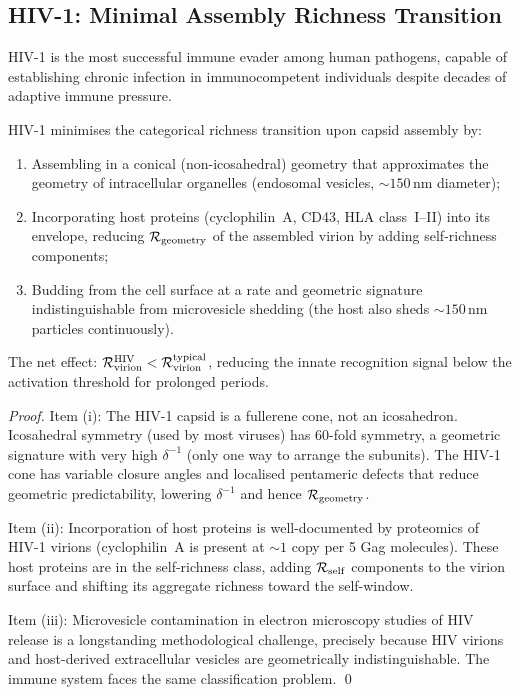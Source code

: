 \subsection{HIV-1: Minimal Assembly Richness Transition}

HIV-1 is the most successful immune evader among human pathogens, capable of
establishing chronic infection in immunocompetent individuals despite decades
of adaptive immune pressure.

\begin{proposition}
\label{prop:hiv_evasion}
HIV-1 minimises the categorical richness transition upon capsid assembly by:
\begin{enumerate}[label=(\roman*)]
  \item Assembling in a conical (non-icosahedral) geometry that approximates
        the geometry of intracellular organelles (endosomal vesicles,
        $\sim 150\,\mathrm{nm}$ diameter);
  \item Incorporating host proteins (cyclophilin~A, CD43, HLA class~I--II)
        into its envelope, reducing $\mathcal{R}_{\mathrm{geometry}}$ of the assembled
        virion by adding self-richness components;
  \item Budding from the cell surface at a rate and geometric signature
        indistinguishable from microvesicle shedding (the host also sheds
        $\sim 150\,\mathrm{nm}$ particles continuously).
\end{enumerate}
The net effect: $\mathcal{R}_{\mathrm{virion}}^{\mathrm{HIV}} < \mathcal{R}_{\mathrm{virion}}^{\mathrm{typical}}$,
reducing the innate recognition signal below the activation threshold for
prolonged periods.
\end{proposition}

\begin{proof}
Item (i): The HIV-1 capsid is a fullerene cone, not an icosahedron. Icosahedral
symmetry (used by most viruses) has 60-fold symmetry, a geometric signature
with very high $\delta^{-1}$ (only one way to arrange the subunits). The HIV-1
cone has variable closure angles and localised pentameric defects that reduce
geometric predictability, lowering $\delta^{-1}$ and hence $\mathcal{R}_{\mathrm{geometry}}$.

Item (ii): Incorporation of host proteins is well-documented by proteomics
of HIV-1 virions (cyclophilin~A is present at $\sim 1$ copy per 5 Gag
molecules). These host proteins are in the self-richness class, adding
$\mathcal{R}_{\mathrm{self}}$ components to the virion surface and shifting its
aggregate richness toward the self-window.

Item (iii): Microvesicle contamination in electron microscopy studies of HIV
release is a longstanding methodological challenge, precisely because HIV
virions and host-derived extracellular vesicles are geometrically
indistinguishable. The immune system faces the same classification problem. \qed
\end{proof}

